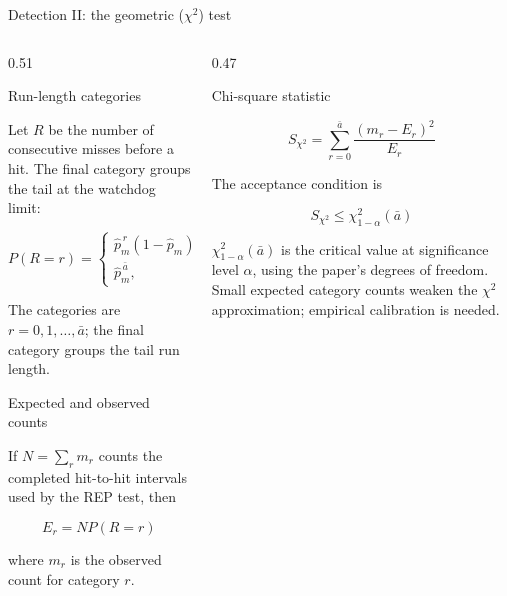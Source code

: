 \documentclass[8pt,aspectratio=169]{beamer}
\gdef\CPSOrigin{PAPER}%
\gdef\CPSSourceContext{}%
\begin{document}
\begin{frame}{Detection II: the geometric ($\chi^2$) test}
\gdef\CPSSourceContext{}
\gdef\CPSOrigin{PAPER}

\footnotesize

\begin{columns}[T,onlytextwidth]

\begin{column}{0.51\textwidth}

\begin{block}{Run-length categories}

Let $R$ be the number of consecutive misses before a hit.
The final category groups the tail at the watchdog limit:

\[
P(R=r)=
\begin{cases}
\hat p_m^{\,r}(1-\hat p_m),
    &0\leq r<\bar a,\\[1mm]
\hat p_m^{\,\bar a},
    &r=\bar a.
\end{cases}
\]

\scriptsize
The categories are $r=0,1,\ldots,\bar a$; the final
category groups the tail run length.

\end{block}

\begin{block}{Expected and observed counts}

If $N=\sum_r m_r$ counts the completed hit-to-hit intervals
used by the REP test, then

\[
\boxed{
E_r=NP(R=r)
}
\]

where $m_r$ is the observed count for category $r$.

\end{block}

\end{column}


\begin{column}{0.47\textwidth}

\begin{block}{Chi-square statistic}

\[
\boxed{
S_{\chi^2}
=
\sum_{r=0}^{\bar a}
\frac{(m_r-E_r)^2}{E_r}
}
\]

The acceptance condition is

\[
\boxed{
S_{\chi^2}
\leq
\chi^2_{1-\alpha}(\bar a)
}
\]

\scriptsize
$\chi^2_{1-\alpha}(\bar a)$ is the critical value at
significance level $\alpha$, using the paper's
degrees of freedom. Small expected category counts weaken the $\chi^2$ approximation; empirical calibration is needed.


\end{block}
\end{column}
\end{columns}
\end{frame}
\end{document}
